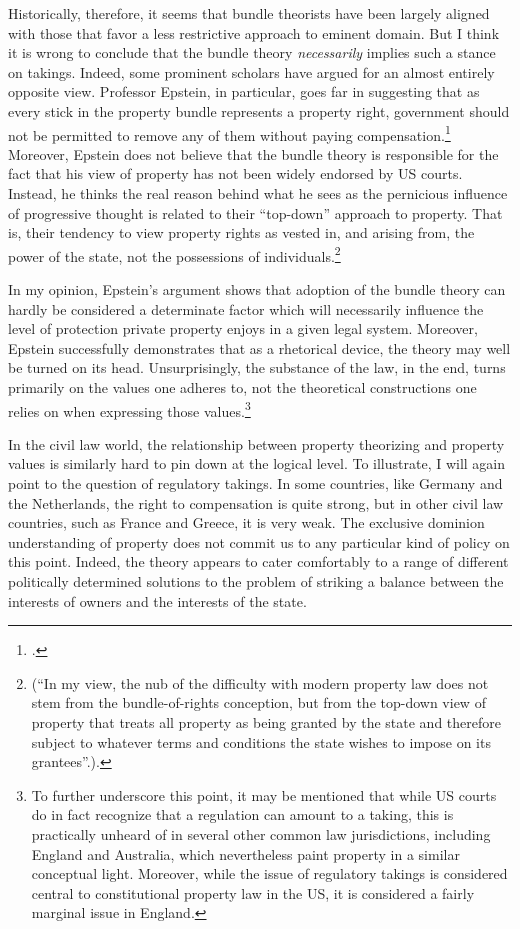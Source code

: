 Historically, therefore, it seems that bundle theorists have been largely aligned with those that favor a less restrictive approach to eminent domain. But I think it is wrong to conclude that the bundle theory {\it necessarily} implies such a stance on takings. Indeed, some prominent scholars have argued for an almost entirely opposite view. Professor Epstein, in particular, goes far in suggesting that as every stick in the property bundle represents a property right, government should not be permitted to remove any of them without paying compensation.\footcite[232-233]{epstein11} Moreover, Epstein does not believe that the bundle theory is responsible for the fact that his view of property has not been widely endorsed by US courts. Instead, he thinks the real reason behind what he sees as the pernicious influence of progressive thought is related to their ``top-down'' approach to property. That is, their tendency to view property rights as vested in, and arising from, the power of the state, not the possessions of individuals.\footnote{\cite[227-228]{epstein11} (``In my view, the nub of the difficulty with modern property law does not stem from the bundle-of-rights conception, but from the top-down view of property that treats all property as being granted by the state and therefore subject to whatever terms and conditions the state wishes to impose on its grantees''.).} 

In my opinion, Epstein's argument shows that adoption of the bundle theory can hardly be considered a determinate factor which will necessarily influence the level of protection private property enjoys in a given legal system. Moreover, Epstein successfully demonstrates that as a rhetorical device, the theory may well be turned on its head. Unsurprisingly, the substance of the law, in the end, turns primarily on the values one adheres to, not the theoretical constructions one relies on when expressing those values.\footnote{To further underscore this point, it may be mentioned that while US courts do in fact recognize that a regulation can amount to a taking, this is practically unheard of in several other common law jurisdictions, including England and Australia, which nevertheless paint property in a similar conceptual light. Moreover, while the issue of regulatory takings is considered central to constitutional property law in the US, it is considered a fairly marginal issue in England.\cite{altermann12}}

In the civil law world, the relationship between property theorizing and property values is similarly hard to pin down at the logical level. To illustrate, I will again point to the question of regulatory takings. In some countries, like Germany and the Netherlands, the right to compensation is quite strong, but in other civil law countries, such as France and Greece, it is very weak. The exclusive dominion understanding of property does not commit us to any particular kind of policy on this point. Indeed, the theory appears to cater comfortably to a range of different politically determined solutions to the problem of striking a balance between the interests of owners and the interests of the state. 

